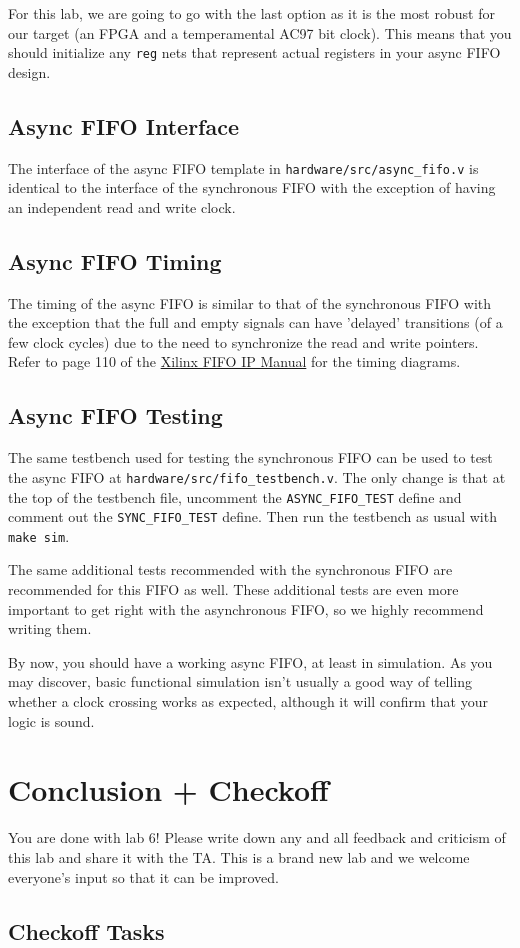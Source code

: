 \documentclass[11pt]{article}
\begin{document}
For this lab, we are going to go with the last option as it is the most robust for our target (an FPGA and a temperamental AC97 bit clock). This means that you should initialize any \verb|reg| nets that represent actual registers in your async FIFO design.

\subsection{Async FIFO Interface}
The interface of the async FIFO template in \verb|hardware/src/async_fifo.v| is identical to the interface of the synchronous FIFO with the exception of having an independent read and write clock.

\subsection{Async FIFO Timing}
The timing of the async FIFO is similar to that of the synchronous FIFO with the exception that the full and empty signals can have 'delayed' transitions (of a few clock cycles) due to the need to synchronize the read and write pointers. Refer to page 110 of the \href{https://www.xilinx.com/support/documentation/ip_documentation/fifo_generator_ug175.pdf}{Xilinx FIFO IP Manual} for the timing diagrams.

\subsection{Async FIFO Testing}
The same testbench used for testing the synchronous FIFO can be used to test the async FIFO at \verb|hardware/src/fifo_testbench.v|. The only change is that at the top of the testbench file, uncomment the \verb|ASYNC_FIFO_TEST| define and comment out the \verb|SYNC_FIFO_TEST| define. Then run the testbench as usual with \verb|make sim|.

The same additional tests recommended with the synchronous FIFO are recommended for this FIFO as well. These additional tests are even more important to get right with the asynchronous FIFO, so we highly recommend writing them.

By now, you should have a working async FIFO, at least in simulation. As you may discover, basic functional simulation isn't usually a good way of telling whether a clock crossing works as expected, although it will confirm that your logic is sound.

\section{Conclusion + Checkoff}
You are done with lab 6! Please write down any and all feedback and criticism of this lab and share it with the TA. This is a brand new lab and we welcome everyone's input so that it can be improved.


\subsection{Checkoff Tasks}
\end{document}
